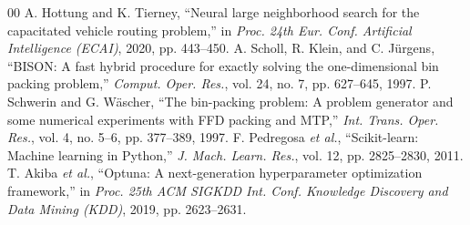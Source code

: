 \documentclass[conference]{IEEEtran}
\begin{document}
\begin{thebibliography}{00}
	 A. Hottung and K. Tierney, ``Neural large neighborhood search for the capacitated vehicle routing problem,'' in \textit{Proc. 24th Eur. Conf. Artificial Intelligence (ECAI)}, 2020, pp. 443--450.
	 A. Scholl, R. Klein, and C. J\"urgens, ``BISON: A fast hybrid procedure for exactly solving the one-dimensional bin packing problem,'' \textit{Comput. Oper. Res.}, vol. 24, no. 7, pp. 627--645, 1997.
	 P. Schwerin and G. W\"ascher, ``The bin-packing problem: A problem generator and some numerical experiments with FFD packing and MTP,'' \textit{Int. Trans. Oper. Res.}, vol. 4, no. 5--6, pp. 377--389, 1997.
	 F. Pedregosa \textit{et al.}, ``Scikit-learn: Machine learning in Python,'' \textit{J. Mach. Learn. Res.}, vol. 12, pp. 2825--2830, 2011.
	 T. Akiba \textit{et al.}, ``Optuna: A next-generation hyperparameter optimization framework,'' in \textit{Proc. 25th ACM SIGKDD Int. Conf. Knowledge Discovery and Data Mining (KDD)}, 2019, pp. 2623--2631.
\end{thebibliography}
\end{document}

